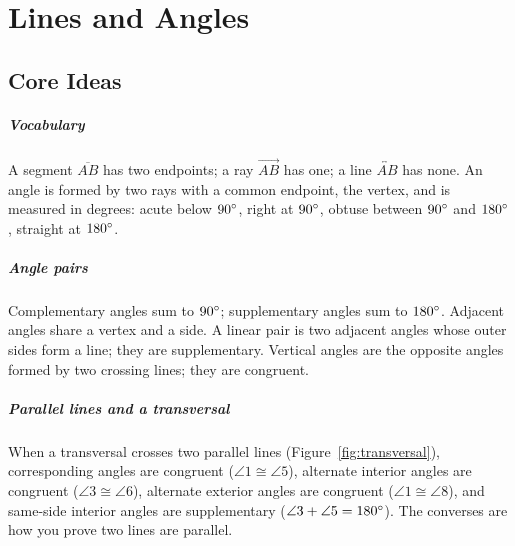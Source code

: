 \chapter{Lines and Angles}


\section{Core Ideas}

\paragraph{Vocabulary} A segment $\overline{AB}$ has two endpoints; a ray $\overrightarrow{AB}$ has one; a line $\overleftrightarrow{AB}$ has none. An angle is formed by two rays with a common endpoint, the vertex, and is measured in degrees: acute below $90^\circ$, right at $90^\circ$, obtuse between $90^\circ$ and $180^\circ$, straight at $180^\circ$.

\paragraph{Angle pairs} Complementary angles sum to $90^\circ$; supplementary angles sum to $180^\circ$. Adjacent angles share a vertex and a side. A linear pair is two adjacent angles whose outer sides form a line; they are supplementary. Vertical angles are the opposite angles formed by two crossing lines; they are congruent.

\paragraph{Parallel lines and a transversal} When a transversal crosses two parallel lines (Figure~\ref{fig:transversal}), corresponding angles are congruent ($\angle 1 \cong \angle 5$), alternate interior angles are congruent ($\angle 3 \cong \angle 6$), alternate exterior angles are congruent ($\angle 1 \cong \angle 8$), and same-side interior angles are supplementary ($\angle 3 + \angle 5 = 180^\circ$). The converses are how you prove two lines are parallel.

